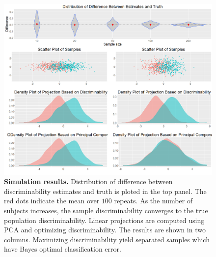 \documentclass{article}
\begin{document}
\newpage
\begin{figure}[ht!]
	\includegraphics[width=\linewidth]{../Figs/comb_simu.png}
	\caption{{\bf Simulation results.} Distribution of difference between discriminability estimates and truth is ploted in the top panel. The red dots indicate the mean over $100$ repeats. As the number of subjects increases, the sample discriminability converges to the true population discriminability. Linear projections are computed using PCA and optimizing discriminability. The results are shown in two columns. Maximizing discriminability yield separated samples which have Bayes optimal classification error.}
	\label{fig:comb_simu}
\end{figure}
\end{document}
